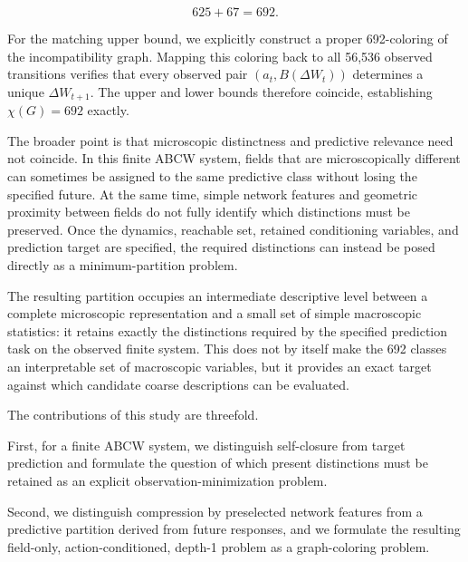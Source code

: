 \documentclass[
  11pt,
]{article}
\begin{document}
\[{625+67=692.}\]

For the matching upper bound, we explicitly construct a proper
692-coloring of the incompatibility graph. Mapping this coloring back to
all 56,536 observed transitions verifies that every observed pair
\({(a_t,B(\Delta W_t))}\) determines a unique \({\Delta W_{t+1}}\). The
upper and lower bounds therefore coincide, establishing
\({\chi(G)=692}\) exactly.

\begin{center}
\end{center}

The broader point is that microscopic distinctness and predictive
relevance need not coincide. In this finite ABCW system, fields that are
microscopically different can sometimes be assigned to the same
predictive class without losing the specified future. At the same time,
simple network features and geometric proximity between fields do not
fully identify which distinctions must be preserved. Once the dynamics,
reachable set, retained conditioning variables, and prediction target are
specified, the required distinctions can instead be posed directly as a
minimum-partition problem.

The resulting partition occupies an intermediate descriptive level
between a complete microscopic representation and a small set of simple
macroscopic statistics: it retains exactly the distinctions required by
the specified prediction task on the observed finite system. This does
not by itself make the 692 classes an interpretable set of macroscopic
variables, but it provides an exact target against which candidate
coarse descriptions can be evaluated.

The contributions of this study are threefold.

First, for a finite ABCW system, we distinguish self-closure from target
prediction and formulate the question of which present distinctions must
be retained as an explicit observation-minimization problem.

Second, we distinguish compression by preselected network features from
a predictive partition derived from future responses, and we formulate
the resulting field-only, action-conditioned, depth-1 problem as a
graph-coloring problem.
\end{document}
